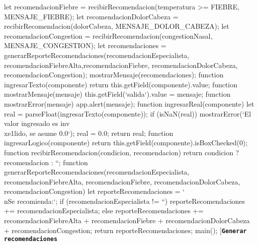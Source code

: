\documentclass{article}
\begin{document}
{\begin{Form}
{{	        let recomendacionFiebre = recibirRecomendacion(temperatura >= FIEBRE, MENSAJE_FIEBRE);
	        let recomendacionDolorCabeza = recibirRecomendacion(dolorCabeza, MENSAJE_DOLOR_CABEZA);
	        let recomendacionCongestion = recibirRecomendacion(congestionNasal, MENSAJE_CONGESTION);
            let recomendaciones = generarReporteRecomendaciones(recomendacionEspecialista, recomendacionFiebreAlta,recomendacionFiebre, recomendacionDolorCabeza,	recomendacionCongestion);
            mostrarMensaje(recomendaciones);
        }
        function ingresarTexto(componente) {
            return this.getField(componente).value;
        }
        function mostrarMensaje(mensaje) {
			this.getField(`salida`).value = mensaje;
		}
        function mostrarError(mensaje) {
            app.alert(mensaje);
        }
        function ingresarReal(componente) {
			let real = parseFloat(ingresarTexto(componente));
            if (isNaN(real)) {
              mostrarError(`El valor ingresado es inv\\xe1lido, se asume 0.0`);
              real = 0.0;
            }
            return real;
		}
		function ingresarLogico(componente) {
		    return this.getField(componente).isBoxChecked(0);
		}
        function recibirRecomendacion(condicion, recomendacion) {
            return condicion ? recomendacion : ``;
        }
        function generarReporteRecomendaciones(recomendacionEspecialista, recomendacionFiebreAlta, recomendacionFiebre, recomendacionDolorCabeza, recomendacionCongestion) {
            let reporteRecomendaciones = `\\nSe recomienda:`;
            if (recomendacionEspecialista != ``) {
                reporteRecomendaciones += recomendacionEspecialista;
            } else {
                reporteRecomendaciones += recomendacionFiebreAlta + recomendacionFiebre + recomendacionDolorCabeza + recomendacionCongestion;
            }
            return reporteRecomendaciones;
        }
        main();
        }]{\texttt{\textbf{Generar recomendaciones}}}
\end{Form}
}
\end{document}
